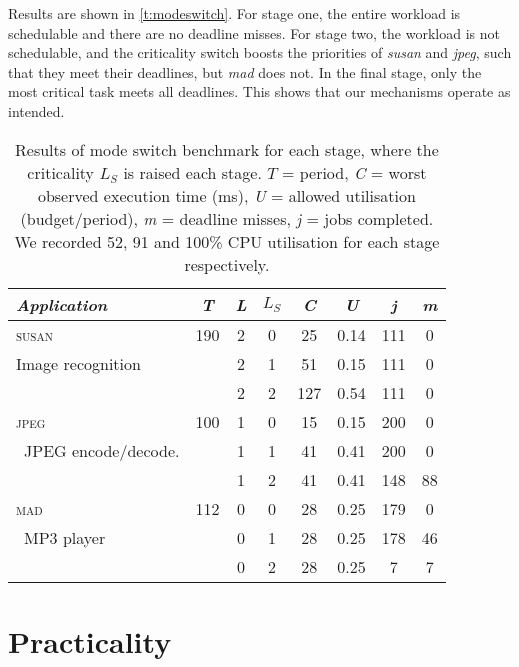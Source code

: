 Results are shown in \autoref{t:modeswitch}. For stage one, the entire workload is schedulable and
there are no deadline misses. For stage two, the workload is not
schedulable, and the criticality switch boosts the priorities of
\textit{susan} and \textit{jpeg}, such that they meet
their deadlines, but
\textit{mad} does not. In the final stage, only the most critical task
meets all deadlines.
This shows that our mechanisms operate as intended.

\begin{table}[h]
    \centering
    \begin{tabular}{lccccccc}\toprule
        \emph{Application} & \emph{T} & \emph{L} & \emph{\(L_S\)} & \emph{C} & \emph{U} & \emph{j} & \emph{m} \\\midrule
        \textsc{susan}            & 190 &2 & 0 & 25 & 0.14 & 111 & 0 \\
        \rowcolor{gray!25}
        \small{Image recognition} &     &2 & 1 & 51 & 0.15 & 111 & 0 \\
                                  &     &2 & 2 & 127 & 0.54 & 111 & 0 \\\midrule
        \textsc{jpeg}             & 100 &1 & 0 & 15 & 0.15 & 200 & 0 \\
        \rowcolor{gray!25}\
        \small{JPEG encode/decode.}       &     &1 & 1 & 41 & 0.41 & 200 & 0 \\
                                  &     &1 & 2 & 41 & 0.41 & 148 & 88 \\\midrule
        \textsc{mad}              & 112 &0 & 0 & 28 & 0.25 & 179 & 0 \\
        \rowcolor{gray!25}\
        \small{MP3 player}        &     &0 & 1 & 28 & 0.25 & 178 & 46\\
                                  &     &0 & 2 & 28 & 0.25 & 7 & 7 \\
        \bottomrule
    \end{tabular}
    \caption{Results of mode switch benchmark for each
        stage, where the  criticality \(L_S\) is raised each stage. \(T\) =
        period, \textit{C} = worst observed execution time (ms),
      \textit{U} = allowed utilisation (budget/period),
    \textit{m} = deadline misses, \textit{j} = jobs completed. We recorded 52, 91 and 100\% CPU
utilisation for each stage respectively.}
    \label{t:modeswitch}
\end{table}


\section{Practicality}

